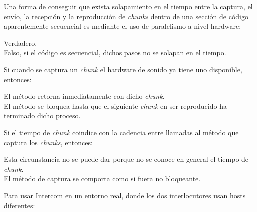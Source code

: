 \documentclass[legalpaper, 12pt, addpoints]{exam}
\begin{document}
\begin{questions}
\vspace{0.10in}

\question Una forma de conseguir que exista solapamiento en el tiempo
entre la captura, el envío, la recepción y la reproducción de
\emph{chunks} dentro de una sección de código aparentemente secuencial
es mediante el uso de paralelismo a nivel hardware:

\begin{oneparchoices}
  \choice Verdadero.\\
  \choice Falso, si el código es secuencial, dichos pasos no se solapan en el tiempo.
\end{oneparchoices}
  
\vspace{0.10in}

\question Si cuando se captura un \emph{chunk} el hardware de sonido
ya tiene uno disponible, entonces:

\begin{oneparchoices}
  \choice El método retorna inmediatamente con dicho \emph{chunk}.\\
  \choice El método se bloquea hasta que el siguiente \emph{chunk} en ser reproducido ha terminado dicho proceso.
\end{oneparchoices}
  
\vspace{0.10in}

\question Si el tiempo de \emph{chunk} coindice con la cadencia entre
llamadas al método que captura los \emph{chunks}, entonces:

\begin{oneparchoices}
  \choice Esta circunstancia no se puede dar porque no se conoce en general el tiempo de \emph{chunk}.\\
  \choice El método de captura se comporta como si fuera no bloqueante.
\end{oneparchoices}
  
\vspace{0.10in}

\question Para usar Intercom en un entorno real, donde los dos
interlocutores usan hosts diferentes:

  

\end{questions}
\end{document}
